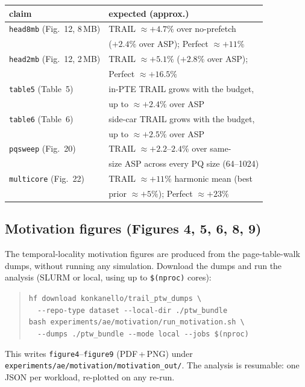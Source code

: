 \begin{center}\small
\begin{tabular}{@{}ll@{}}
\toprule
claim & expected (approx.) \\
\midrule
\texttt{head8mb} (Fig.~12, 8\,MB) & TRAIL $\approx +4.7\%$ over no-prefetch \\
                                  & ($+2.4\%$ over ASP); Perfect $\approx +11\%$ \\
\texttt{head2mb} (Fig.~12, 2\,MB) & TRAIL $\approx +5.1\%$ ($+2.8\%$ over ASP); \\
                                  & Perfect $\approx +16.5\%$ \\
\texttt{table5}  (Table~5)        & in-PTE TRAIL grows with the budget, \\
                                  & up to $\approx +2.4\%$ over ASP \\
\texttt{table6}  (Table~6)        & side-car TRAIL grows with the budget, \\
                                  & up to $\approx +2.5\%$ over ASP \\
\texttt{pqsweep} (Fig.~20)        & TRAIL $\approx +2.2$--$2.4\%$ over same- \\
                                  & size ASP across every PQ size (64--1024) \\
\texttt{multicore} (Fig.~22)      & TRAIL $\approx +11\%$ harmonic mean (best \\
                                  & prior $\approx +5\%$); Perfect $\approx +23\%$ \\
\bottomrule
\end{tabular}
\end{center}

\subsection{Motivation figures (Figures 4, 5, 6, 8, 9)}

The temporal-locality motivation figures are produced from the page-table-walk
dumps, without running any simulation. Download the dumps and run the analysis
(SLURM or local, using up to \texttt{\$(nproc)} cores):
\begin{quote}\small
\texttt{hf download konkanello/trail\_ptw\_dumps \textbackslash}\\
\texttt{\ \ -{}-repo-type dataset -{}-local-dir ./ptw\_bundle}\\[2pt]
\texttt{bash experiments/ae/motivation/run\_motivation.sh \textbackslash}\\
\texttt{\ \ -{}-dumps ./ptw\_bundle -{}-mode local -{}-jobs \$(nproc)}
\end{quote}
This writes \texttt{figure4}--\texttt{figure9} (PDF\,+\,PNG) under
\texttt{experiments/ae/motivation/motivation\_out/}. The analysis is resumable:
one JSON per workload, re-plotted on any re-run.

